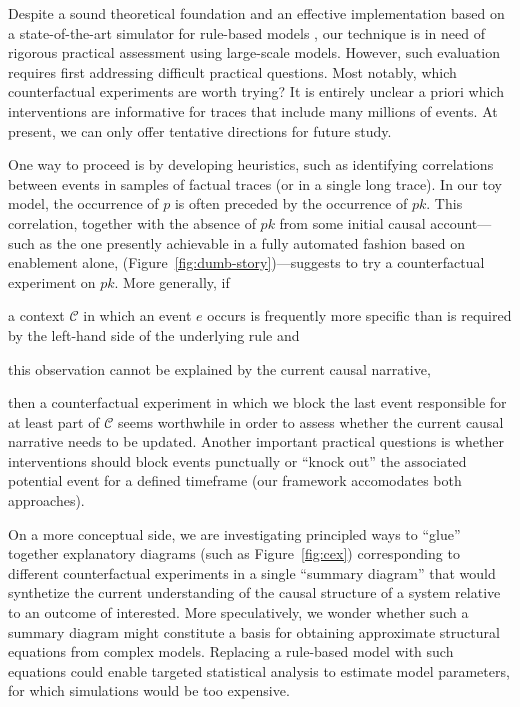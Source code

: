 Despite a sound theoretical foundation and an effective implementation
based on a state-of-the-art simulator for rule-based models
\cite{DanosEtAl-APLAS07,BoutillierEK17}, our technique is in need of
rigorous practical assessment using large-scale models. However, such
evaluation requires first addressing difficult practical
questions. Most notably, which counterfactual experiments are worth
trying? It is entirely unclear a priori which interventions are
informative for traces that include many millions of events. At
present, we can only offer tentative directions for future study.

One way to proceed is by developing heuristics, such as identifying
correlations between events in samples of factual traces (or in a
single long trace). In our toy model, the occurrence of $p$ is often
preceded by the occurrence of $pk$. This correlation, together with
the absence of $pk$ from some initial causal account---such as the one
presently achievable in a fully automated fashion based on enablement
alone, (Figure~\ref{fig:dumb-story})---suggests to try a
counterfactual experiment on $pk$. More generally, if
\begin{inparaenum}[(i)]
\item a context $\mathcal C$ in which an event $e$ occurs is
  frequently more specific than is required by the left-hand side of
  the underlying rule and
\item this observation cannot be explained by the current causal
  narrative,
\end{inparaenum} then a counterfactual experiment in which we block
the last event responsible for at least part of $\mathcal C$ seems
worthwhile in order to assess whether the current causal narrative
needs to be updated.  Another important practical questions is whether
interventions should block events punctually or ``knock out'' the
associated potential event for a defined timeframe (our framework
accomodates both approaches). 

On a more conceptual side, we are investigating principled ways to
``glue'' together explanatory diagrams (such as Figure~\ref{fig:cex})
corresponding to different counterfactual experiments in a single
``summary diagram'' that would synthetize the current understanding of
the causal structure of a system relative to an outcome of
interested. More speculatively, we wonder whether such a summary
diagram might constitute a basis for obtaining approximate structural
equations from complex models. Replacing a rule-based model with such
equations could enable targeted statistical analysis to estimate model
parameters, for which simulations would be too expensive.
